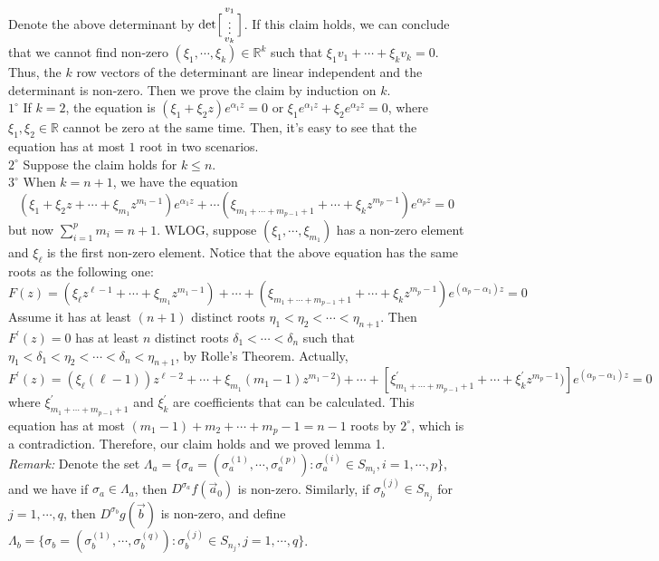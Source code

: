 \documentclass[12pt]{article}
\begin{document}
Denote the above determinant by $\det\Bigl[\begin{smallmatrix} v_{1}\\\vdots\\ v_{k} \end{smallmatrix}\Bigr]$. If this claim holds, we can conclude that we cannot find non-zero $(\xi_{1},\cdots,\xi_{k})\in\mathbb{R}^{k}$ such that $\xi_{1}v_{1}+\cdots+\xi_{k}v_{k}=0$. Thus, the $k$ row vectors of the determinant are linear independent and the determinant is non-zero. Then we prove the claim by induction on $k$.\\
$1^{\circ}$ If $k=2$, the equation is $(\xi_{1}+\xi_{2}z)e^{\alpha_{1}z}=0$ or $\xi_{1}e^{\alpha_{1}z}+\xi_{2}e^{\alpha_{2}z}=0$, where $\xi_{1},\xi_{2}\in\mathbb{R}$ cannot be zero at the same time. Then, it's easy to see that the equation has at most $1$ root in two scenarios.\\
$2^{\circ}$ Suppose the claim holds for $k\leqslant n$.\\
$3^{\circ}$ When $k=n+1$, we have the equation $$(\xi_{1}+\xi_{2}z+\cdots+\xi_{m_1}z^{m_{i}-1})e^{\alpha_{1}z}+\cdots(\xi_{m_{1}+\cdots+m_{p-1}+1}+\cdots+\xi_{k}z^{m_{p}-1})e^{\alpha_{p}z}=0$$ but now $\sum_{i=1}^{p}m_{i}=n+1$. WLOG, suppose $(\xi_{1},\cdots,\xi_{m_{1}})$ has a non-zero element and $\xi_{\ell}$ is the first non-zero element. Notice that the above equation has the same roots as the following one:
$$F(z)=(\xi_{\ell}z^{\ell-1}+\cdots+\xi_{m_1}z^{m_1-1})+\cdots+(\xi_{m_1+\cdots+m_{p-1}+1}+\cdots+\xi_{k}z^{m_{p}-1})e^{(\alpha_{p}-\alpha_{1})z}=0$$
Assume it has at least $(n+1)$ distinct roots $\eta_{1}<\eta_{2}<\cdots<\eta_{n+1}$. Then $F^{\prime}(z)=0$ has at least $n$ distinct roots $\delta_{1}<\cdots<\delta_{n}$ such that $\eta_{1}<\delta_{1}<\eta_{2}<\cdots<\delta_{n}<\eta_{n+1}$, by Rolle's Theorem. Actually, $F^{\prime}(z)=(\xi_{\ell}(\ell-1))z^{\ell-2}+\cdots+\xi_{m_1}(m_1-1)z^{m_{1}-2})+\cdots+[\xi_{m_1+\cdots+m_{p-1}+1}^{\prime}+\cdots+\xi_{k}^{\prime}z^{m_{p}-1})]e^{(\alpha_{p}-\alpha_{1})z}=0$
where $\xi_{m_1+\cdots+m_{p-1}+1}^{\prime}$ and $\xi_{k}^{\prime}$ are coefficients that can be calculated. This equation has at most $(m_1-1)+m_2+\cdots+m_{p}-1=n-1$ roots by $2^{\circ}$, which is a contradiction. Therefore, our claim holds and we proved lemma 1.\\
\emph{Remark:} Denote the set $\Lambda_{a}=\{\sigma_{a}=(\sigma_{a}^{(1)},\cdots,\sigma_{a}^{(p)}):\sigma_{a}^{(i)}\in S_{m_{i}}, i=1,\cdots,p\}$, and we have if $\sigma_{a}\in \Lambda_{a}$, then $D^{\sigma_{a}}f(\vec{a}_{0})$ is non-zero. Similarly, if $\sigma^{(j)}_{b}\in S_{n_j}$ for $j=1,\cdots,q$, then $D^{\sigma_{b}}g(\vec{b})$ is non-zero, and define $\Lambda_{b}=\{\sigma_{b}=(\sigma_{b}^{(1)},\cdots,\sigma_{b}^{(q)}):\sigma_{b}^{(j)}\in S_{n_{j}}, j=1,\cdots,q\}$.\\
\end{document}
